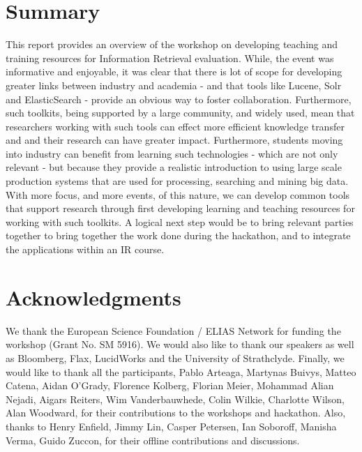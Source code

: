 \documentclass[12pt]{article}
\begin{document}
\begin{sloppypar}







\section{Summary}
This report provides an overview of the workshop on developing teaching and training resources for Information Retrieval evaluation. While, the event was informative and enjoyable, it was clear that there is lot of scope for developing greater links between industry and academia - and that tools like Lucene, Solr and ElasticSearch - provide an obvious way to foster collaboration. Furthermore, such toolkits, being supported by a large community, and widely used, mean that researchers working with such tools can effect more efficient knowledge transfer and and their research can have greater impact. Furthermore, students moving into industry can benefit from learning such technologies - which are not only relevant - but because they provide a realistic introduction to using large scale production systems that are used for processing, searching and mining big data. With more focus, and more events, of this nature, we can develop common tools that support research through first developing learning and teaching resources for working with such toolkits. A logical next step would be to bring relevant parties together to bring together the work done during the hackathon, and to integrate the applications within an IR course.

\section{Acknowledgments}
We thank the European Science Foundation / ELIAS Network for funding the workshop (Grant No. SM 5916). We would also like to thank our speakers as well as Bloomberg, Flax, LucidWorks and the University of Strathclyde. 
Finally, we would like to thank all the participants, 
Pablo Arteaga,
Martynas Buivys, 
Matteo Catena, 
Aidan O'Grady, 
Florence Kolberg, 
Florian Meier,  
Mohammad Alian Nejadi,
Aigars Reiters, 
Wim Vanderbauwhede, 
Colin Wilkie,   
Charlotte Wilson, 
Alan Woodward, 
for their contributions to the workshops and hackathon. Also, thanks to Henry Enfield, Jimmy Lin, Casper Petersen, Ian Soboroff, Manisha Verma, Guido Zuccon, for their offline contributions and discussions.



{}


%
\end{sloppypar}
\end{document}
